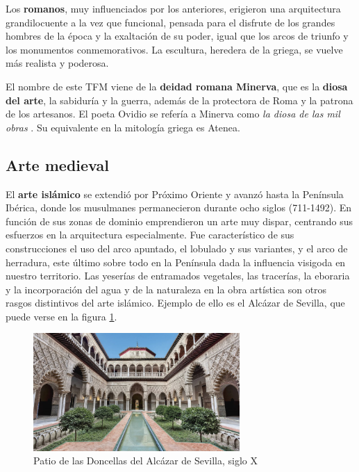 Los \textbf{romanos}, muy influenciados por los anteriores, erigieron una arquitectura grandilocuente a la vez que funcional, pensada para el disfrute de los grandes hombres de la época y la exaltación de su poder, igual que los arcos de triunfo y los monumentos conmemorativos. La escultura, heredera de la griega, se vuelve más realista y poderosa.

El nombre de este \acs{TFM} viene de la \textbf{deidad romana Minerva}, que es la \textbf{diosa del arte}, la sabiduría y la guerra, además de la protectora de Roma y la patrona de los artesanos. El poeta Ovidio se refería a Minerva como \textit{la diosa de las mil obras} \cite{lomb-13}. Su equivalente en la mitología griega es Atenea.

\subsection{Arte medieval}

El \textbf{arte islámico} se extendió por Próximo Oriente y avanzó hasta la Península Ibérica, donde los musulmanes permanecieron durante ocho siglos (711-1492). En función de sus zonas de dominio emprendieron un arte muy dispar, centrando sus esfuerzos en la arquitectura especialmente. Fue característico de sus construcciones el uso del arco apuntado, el lobulado y sus variantes, y el arco de herradura, este último sobre todo en la Península dada la influencia visigoda en nuestro territorio. Las yeserías de entramados vegetales, las tracerías, la eboraria y la incorporación del agua y de la naturaleza en la obra artística son otros rasgos distintivos del arte islámico. Ejemplo de ello es el Alcázar de Sevilla, que puede verse en la figura \ref{fig:patio-doncellas}.

\begin{figure}[!h]
    \begin{center}
        \includegraphics[width=0.7\textwidth]{imagenes/2/patio-doncellas.jpg}
        \caption{Patio de las Doncellas del Alcázar de Sevilla, siglo X}
        \label{fig:patio-doncellas}
    \end{center}
\end{figure}

